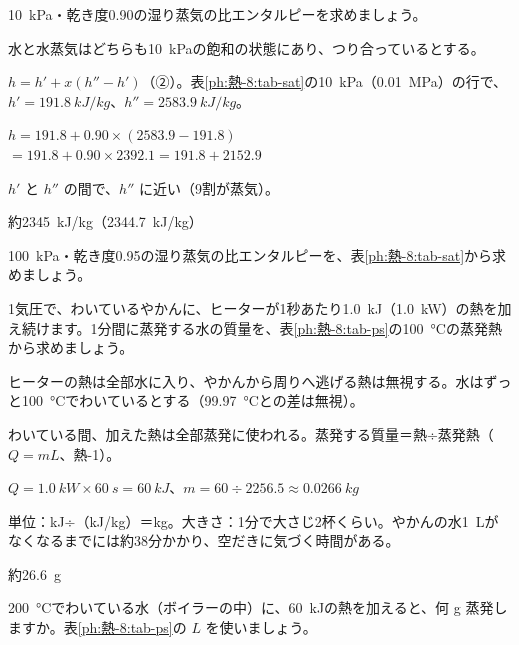 \begin{reidai}[湿り蒸気の比エンタルピー]
\label{ph:熱-8:ex4}\qty{10}{kPa}・乾き度0.90の湿り蒸気の比エンタルピーを求めましょう。
\par{} 水と水蒸気はどちらも\qty{10}{kPa}の飽和の状態にあり、つり合っているとする。
\par\kangaekata $h=h'+x(h''-h')$（②）。表\ref{ph:熱-8:tab-sat}の\qty{10}{kPa}（\qty{0.01}{MPa}）の行で、$h'=\qty{191.8}{kJ/kg}$、$h''=\qty{2583.9}{kJ/kg}$。
\par\shiki $h=191.8+0.90\times(2583.9-191.8)$\\ \hspace*{2\zw}$=191.8+0.90\times2392.1=191.8+2152.9$
\par{} $h'$ と $h''$ の間で、$h''$ に近い（9割が蒸気）。
\par\kotae 約\qty{2345}{kJ/kg}（\qty{2344.7}{kJ/kg}）
\end{reidai}
\begin{jibun}
\qty{100}{kPa}・乾き度0.95の湿り蒸気の比エンタルピーを、表\ref{ph:熱-8:tab-sat}から求めましょう。
\end{jibun}

\begin{reidai}
\label{ph:熱-8:ex5}1気圧で、わいているやかんに、ヒーターが1秒あたり\qty{1.0}{kJ}（\qty{1.0}{kW}）の熱を加え続けます。1分間に蒸発する水の質量を、表\ref{ph:熱-8:tab-ps}の\qty{100}{\celsius}の蒸発熱から求めましょう。
\par{} ヒーターの熱は全部水に入り、やかんから周りへ逃げる熱は無視する。水はずっと\qty{100}{\celsius}でわいているとする（\qty{99.97}{\celsius}との差は無視）。
\par\kangaekata わいている間、加えた熱は全部蒸発に使われる。蒸発する質量＝熱÷蒸発熱（$Q=mL$、熱-1）。
\par\shiki $Q=\qty{1.0}{kW}\times\qty{60}{s}=\qty{60}{kJ}$、$m=60\div2256.5\approx\qty{0.0266}{kg}$
\par{} 単位：kJ÷（kJ/kg）＝kg。大きさ：1分で大さじ2杯くらい。やかんの水\qty{1}{L}がなくなるまでには約38分かかり、空だきに気づく時間がある。
\par\kotae 約\qty{26.6}{g}
\end{reidai}
\begin{jibun}
\qty{200}{\celsius}でわいている水（ボイラーの中）に、\qty{60}{kJ}の熱を加えると、何 g 蒸発しますか。表\ref{ph:熱-8:tab-ps}の $L$ を使いましょう。
\end{jibun}

